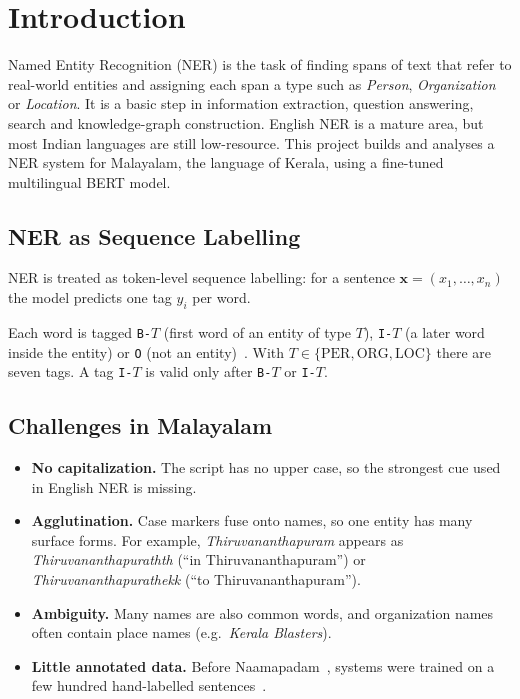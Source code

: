 \chapter{Introduction}

Named Entity Recognition (NER) is the task of finding spans of text that
refer to real-world entities and assigning each span a type such as
\emph{Person}, \emph{Organization} or \emph{Location}. It is a basic step
in information extraction, question answering, search and knowledge-graph
construction. English NER is a mature area, but most Indian languages are
still low-resource. This project builds and analyses a NER system for
Malayalam, the language of Kerala, using a fine-tuned multilingual BERT
model.

\section{NER as Sequence Labelling}

NER is treated as token-level sequence labelling: for a sentence
$\mathbf{x} = (x_1, \ldots, x_n)$ the model predicts one tag $y_i$ per word.

\begin{definition}\label{def:iob2}
Each word is tagged \texttt{B-}$T$ (first word of an entity of type $T$),
\texttt{I-}$T$ (a later word inside the entity) or \texttt{O} (not an
entity)~\cite{ramshaw1995text}. With $T \in \{\mathrm{PER}, \mathrm{ORG},
\mathrm{LOC}\}$ there are seven tags. A tag \texttt{I-}$T$ is valid only
after \texttt{B-}$T$ or \texttt{I-}$T$.
\end{definition}

\section{Challenges in Malayalam}

\begin{itemize}
  \item \textbf{No capitalization.} The script has no upper case, so the
  strongest cue used in English NER is missing.
  \item \textbf{Agglutination.} Case markers fuse onto names, so one entity
  has many surface forms. For example, \emph{Thiruvananthapuram} appears as
  \emph{Thiruvananthapurathth} (``in Thiruvananthapuram'') or
  \emph{Thiruvananthapurathekk} (``to Thiruvananthapuram'').
  \item \textbf{Ambiguity.} Many names are also common words, and
  organization names often contain place names (e.g.\ \emph{Kerala
  Blasters}).
  \item \textbf{Little annotated data.} Before Naamapadam~\cite{mhaske2023naamapadam},
  systems were trained on a few hundred hand-labelled
  sentences~\cite{lakshmi2016fuzzy, sp2020towards}.
\end{itemize}

